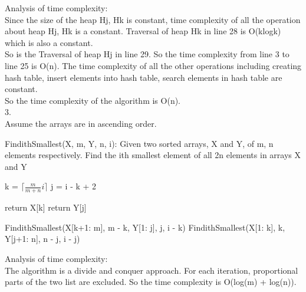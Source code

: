 \documentclass{article}
\begin{document}
Analysis of time complexity:\\
Since the size of the heap Hj, Hk is constant, time complexity of all the operation about heap Hj, Hk is a constant. Traversal of heap Hk in line 28 is O(klogk) which is also a constant.\\
So is the Traversal of heap Hj in line 29. So the time complexity from line 3 to line 25 is O(n). The time complexity of all the other operations including creating hash table, insert elements into hash table, search elements in hash table are constant.\\
So the time complexity of the algorithm is O(n).\\



3.\\
Assume the arrays are in ascending order.\\

\begin{algorithm}[H]
	\caption{\newline FindithSmallest(X, m, Y, n, i): Given two sorted arrays, X and Y, of m, n elements respectively. Find the ith smallest element of all 2n elements in arrays X and Y}
	k = $\lceil \frac{m}{m+n}i \rceil$\;
	j = i - k + 2\;
	
	{
		return X[k]\;
	}
	{
		return Y[j]\;
	}
	
	{
		FindithSmallest(X[k+1: m], m - k, Y[1: j], j, i - k)
	}
	{
		FindithSmallest(X[1: k], k, Y[j+1: n], n - j, i - j)
	}
\end{algorithm}
Analysis of time complexity:\\
The algorithm is a divide and conquer approach. For each iteration, proportional parts of the two list are excluded. So the time complexity is O(log(m) + log(n)).\\
\end{document}
